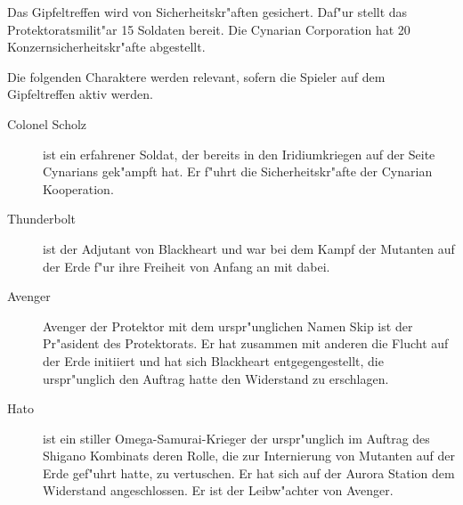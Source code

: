 
Das Gipfeltreffen wird von Sicherheitskr"aften gesichert. Daf"ur stellt das Protektoratsmilit"ar 15 Soldaten bereit. Die 
Cynarian Corporation hat 20 Konzernsicherheitskr"afte abgestellt.

Die folgenden Charaktere werden relevant, sofern die Spieler auf dem Gipfeltreffen aktiv werden.

\begin{description}
    \item[Colonel Scholz] ist ein erfahrener Soldat, der bereits in den Iridiumkriegen auf der Seite Cynarians gek"ampft hat. Er f"uhrt 
        die Sicherheitskr"afte der Cynarian Kooperation.
    \item[Thunderbolt] ist der Adjutant von Blackheart und war bei dem Kampf der Mutanten auf der Erde f"ur ihre Freiheit von Anfang an mit dabei.
    \item[Avenger] Avenger der Protektor mit dem urspr"unglichen Namen Skip ist der Pr"asident des Protektorats. Er hat zusammen mit 
        anderen die Flucht auf der Erde initiiert und hat sich Blackheart entgegengestellt, die urspr"unglich den Auftrag hatte den Widerstand zu erschlagen.
    \item[Hato] ist ein stiller Omega-Samurai-Krieger der urspr"unglich im Auftrag des Shigano Kombinats deren Rolle, die zur Internierung 
        von Mutanten auf der Erde gef"uhrt hatte, zu vertuschen. Er hat sich auf der Aurora Station dem Widerstand angeschlossen. Er ist der Leibw"achter von Avenger.
\end{description}

